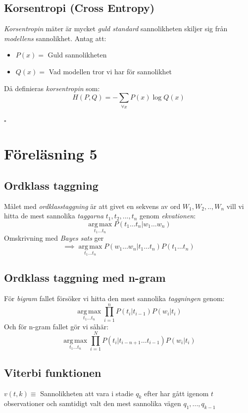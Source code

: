\documentclass[12pt,a4paper]{article}
\begin{document}
\subsection*{Korsentropi (Cross Entropy)}
\textit{Korsentropin} mäter är mycket \textit{guld standard} sannolikheten skiljer sig från \textit{modellens} sannolikhet. Antag att:
\begin{itemize}
    \item $P(x) = $ Guld sannolikheten 
    \item $Q(x) =$ Vad modellen tror vi har för sannolikhet
\end{itemize}


Då definieras \textit{korsentropin} som:
$$H(P, Q) = - \sum_{\forall x} P(x) \log Q(x)$$

\noindent\hrulefill
\newline
\newline
{\Huge $\square$}

\newpage
\section*{Föreläsning 5}

\noindent\hrulefill
\subsection*{Ordklass taggning}
Målet med \textit{ordklasstaggning} är att givet en sekvens av ord $W_1,W_2,..,W_n$ vill vi hitta de mest 
sannolika \textit{taggarna} $t_{1}, t_2,...,t_n$ genom \textit{ekvationen}:
{\large $$\operatorname*{arg\,max}_{t_1 \dots t_n} P(t_1 \dots t_n | w_1 \dots w_n)$$}  Omskrivning med \textit{Bayes sats} ger
{\large $$\implies \operatorname*{arg\,max}_{t_1 \dots t_n} P(w_1 \dots w_n | t_1 \dots t_n) P(t_1 \dots t_n)$$}
\noindent\hrulefill

\subsection*{Ordklass taggning med n-gram}
För \textit{bigram} fallet försöker vi hitta den mest sannolika \textit{taggningen} genom:
{\large $$\operatorname*{arg\,max}_{t_1 \dots t_n} \prod_{i=1}^{n} P(t_i | t_{i-1}) P(w_i | t_i)$$}
\newline \noindent
Och för n-gram fallet gör vi såhär:
{\large $$\operatorname*{arg\,max}_{t_1 \dots t_n} \prod_{i=1}^{N} P(t_i | t_{i-n+1} \dots t_{i-1}) P(w_i | t_i)$$}
\noindent\hrulefill

\subsection*{Viterbi funktionen}
$v(t,k) \equiv$ Sannolikheten att vara i stadie $q_k$ efter har gått igenom $t$ observationer och samtidigt valt den mest sannolika vägen $q_1,...,q_{k-1}$ 
\end{document}
